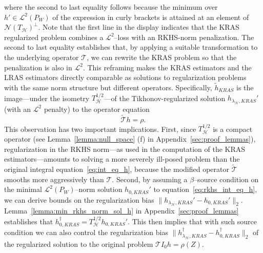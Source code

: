 \documentclass[twoside,11pt]{article}
\newcommand{\mc}{\mathcal}
\begin{document}
where the second to last equality follows because the minimum over $h' \in \mc{L}^2(P_W)$ of the expression in curly brackets is attained at an element of $\mc{N}(T_\mc{H})^\perp$. Note that the first line in the display indicates that the KRAS regularized problem combines a $\mathcal{L}^2$--loss with an RKHS-norm penalization. The second to last equality establishes that, by applying a suitable transformation to the underlying operator $\mc{T}$, we can rewrite the KRAS problem so that the penalization is also in $\mathcal{L}^2$. This reframing makes the KRAS estimators and the LRAS estimators directly comparable as solutions to regularization problems with the same norm structure but different operators. Specifically, $\tilde{h}_{KRAS}$ is the image---under the isometry $T_\mathcal{H}^{1/2}$---of the Tikhonov-regularized solution $h_{\lambda_{\mc{H}},KRAS}'$ (with an $\mathcal{L}^2$ penalty) to the operator equation
\begin{equation} \widetilde{\mathcal{T}} h = \rho. \label{eq:rkhs_int_eq_h}
\end{equation}
This observation has two important implications. First, since $T_\mathcal{H}^{1/2}$ is a compact operator (see Lemma~\ref{lemma:null_space} (f) in Appendix~\ref{sec:proof_lemmas}), regularization in the RKHS norm---as used in the computation of the KRAS estimators---amounts to solving a more severely ill-posed problem than the original integral equation~\eqref{eq:int_eq_h}, because the modified operator $\widetilde{\mathcal{T}}$ smooths more aggressively than $\mathcal{T}$. Second, by assuming a $\beta$--source condition on the minimal $\mathcal{L}^2(P_{W})$--norm solution $h_{0,KRAS}'$ to equation~\eqref{eq:rkhs_int_eq_h}, we can derive bounds on the regularization bias $\| h_{\lambda_{\mc{H}},KRAS}' - h_{0,KRAS}' \|_2$.  Lemma~\ref{lemma:min_rkhs_norm_sol_h} in Appendix~\ref{sec:proof_lemmas} establishes that $h_{0,KRAS}^\dag=T_\mathcal{H}^{1/2}h_{0,KRAS}'$. This then implies that with such source condition we can also control the regularization bias $\| h_{\lambda_{\mc{H}},KRAS}^\dag - h_{0,KRAS}^\dag \|_2$ of the regularized solution to the original problem $\mc{T}I_0h=\rho(Z)$. 
\end{document}
